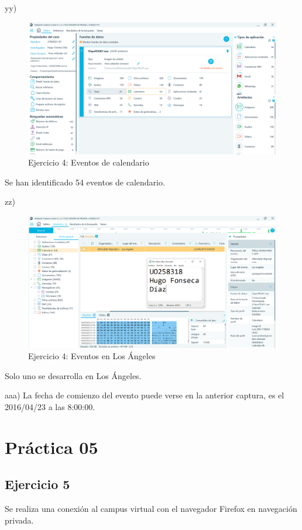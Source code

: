 \documentclass[11pt]{article}
\begin{document}
yy)

\begin{figure}[H]
    \caption{Ejercicio 4: Eventos de calendario}
    \centering
    \includegraphics[scale=0.4]{p04/e7-16.PNG}
\end{figure}

Se han identificado 54 eventos de calendario.

zz)

\begin{figure}[H]
    \caption{Ejercicio 4: Eventos en Los Ángeles}
    \centering
    \includegraphics[scale=0.4]{p04/e7-17.PNG}
\end{figure}

Solo uno se desarrolla en Los Ángeles.

aaa) La fecha de comienzo del evento puede verse en la anterior captura, es el 2016/04/23 a las 8:00:00.



\section{Práctica 05}

\subsection{Ejercicio 5}
Se realiza una conexión al campus virtual con el navegador Firefox en navegación privada.
\end{document}
